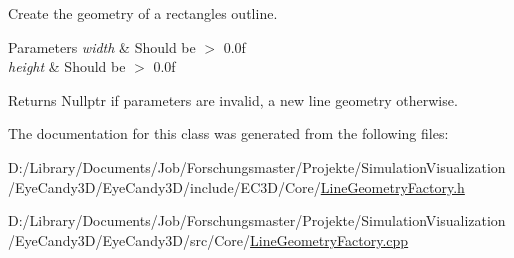 Create the geometry of a rectangle\textquotesingle{}s outline. 


\begin{DoxyParams}{Parameters}
{\em width} & Should be $>$ 0.\+0f \\
\hline
{\em height} & Should be $>$ 0.\+0f \\
\hline
\end{DoxyParams}
\begin{DoxyReturn}{Returns}
Nullptr if parameters are invalid, a new line geometry otherwise. 
\end{DoxyReturn}


The documentation for this class was generated from the following files\+:\begin{DoxyCompactItemize}
\item 
D\+:/\+Library/\+Documents/\+Job/\+Forschungsmaster/\+Projekte/\+Simulation\+Visualization/\+Eye\+Candy3\+D/\+Eye\+Candy3\+D/include/\+E\+C3\+D/\+Core/\mbox{\hyperlink{_line_geometry_factory_8h}{Line\+Geometry\+Factory.\+h}}\item 
D\+:/\+Library/\+Documents/\+Job/\+Forschungsmaster/\+Projekte/\+Simulation\+Visualization/\+Eye\+Candy3\+D/\+Eye\+Candy3\+D/src/\+Core/\mbox{\hyperlink{_line_geometry_factory_8cpp}{Line\+Geometry\+Factory.\+cpp}}\end{DoxyCompactItemize}
